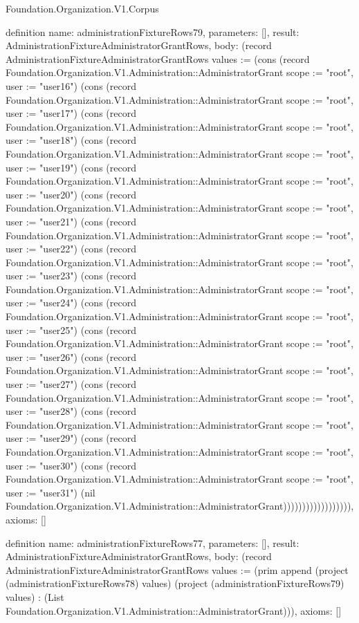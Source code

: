 \begin{lexlean}{Foundation.Organization.V1.Corpus}
\begin{semanticmodule}
definition{
  name: administrationFixtureRows79,
  parameters: [],
  result: AdministrationFixtureAdministratorGrantRows,
  body: (record AdministrationFixtureAdministratorGrantRows {values := (cons (record Foundation.Organization.V1.Administration::AdministratorGrant {scope := "root", user := "user16"}) (cons (record Foundation.Organization.V1.Administration::AdministratorGrant {scope := "root", user := "user17"}) (cons (record Foundation.Organization.V1.Administration::AdministratorGrant {scope := "root", user := "user18"}) (cons (record Foundation.Organization.V1.Administration::AdministratorGrant {scope := "root", user := "user19"}) (cons (record Foundation.Organization.V1.Administration::AdministratorGrant {scope := "root", user := "user20"}) (cons (record Foundation.Organization.V1.Administration::AdministratorGrant {scope := "root", user := "user21"}) (cons (record Foundation.Organization.V1.Administration::AdministratorGrant {scope := "root", user := "user22"}) (cons (record Foundation.Organization.V1.Administration::AdministratorGrant {scope := "root", user := "user23"}) (cons (record Foundation.Organization.V1.Administration::AdministratorGrant {scope := "root", user := "user24"}) (cons (record Foundation.Organization.V1.Administration::AdministratorGrant {scope := "root", user := "user25"}) (cons (record Foundation.Organization.V1.Administration::AdministratorGrant {scope := "root", user := "user26"}) (cons (record Foundation.Organization.V1.Administration::AdministratorGrant {scope := "root", user := "user27"}) (cons (record Foundation.Organization.V1.Administration::AdministratorGrant {scope := "root", user := "user28"}) (cons (record Foundation.Organization.V1.Administration::AdministratorGrant {scope := "root", user := "user29"}) (cons (record Foundation.Organization.V1.Administration::AdministratorGrant {scope := "root", user := "user30"}) (cons (record Foundation.Organization.V1.Administration::AdministratorGrant {scope := "root", user := "user31"}) (nil Foundation.Organization.V1.Administration::AdministratorGrant)))))))))))))))))}),
  axioms: []
}

definition{
  name: administrationFixtureRows77,
  parameters: [],
  result: AdministrationFixtureAdministratorGrantRows,
  body: (record AdministrationFixtureAdministratorGrantRows {values := (prim append (project (administrationFixtureRows78) values) (project (administrationFixtureRows79) values) : (List Foundation.Organization.V1.Administration::AdministratorGrant))}),
  axioms: []
}


\end{semanticmodule}
\end{lexlean}
